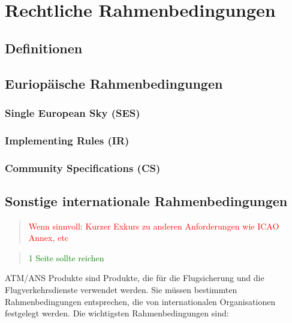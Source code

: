 \chapter{Rechtliche Rahmenbedingungen}

    \section{Definitionen}
        
        \pagebreak

        
    \section{Euriopäische Rahmenbedingungen}
        \subsection{Single European Sky (SES)}
            
            \pagebreak
            
        \subsection{Implementing Rules (IR)}
            
            \pagebreak
        
        \subsection{Community Specifications (CS)}
            
                \pagebreak

    \section{Sonstige internationale Rahmenbedingungen}

    \begin{quote}
\textcolor{red}{Wenn sinnvoll: Kurzer Exkurs zu anderen Anforderungen wie ICAO Annex, etc}
\end{quote}
\begin{quote}
\textcolor{green}{1 Seite sollte reichen}
\end{quote}

ATM/ANS Produkte sind Produkte, die für die Flugsicherung und die Flugverkehrsdienste verwendet werden. Sie müssen bestimmten Rahmenbedingungen entsprechen, die von internationalen Organisationen festgelegt werden. Die wichtigsten Rahmenbedingungen sind:

